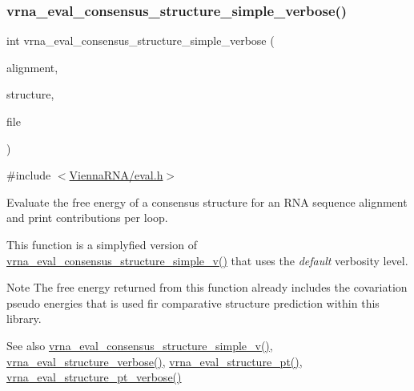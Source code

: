 \subsubsection{\texorpdfstring{vrna\_eval\_consensus\_structure\_simple\_verbose()}{vrna\_eval\_consensus\_structure\_simple\_verbose()}}
{\footnotesize\ttfamily int vrna\+\_\+eval\+\_\+consensus\+\_\+structure\+\_\+simple\+\_\+verbose (\begin{DoxyParamCaption}\item[{const char $\ast$$\ast$}]{alignment,  }\item[{const char $\ast$}]{structure,  }\item[{F\+I\+LE $\ast$}]{file }\end{DoxyParamCaption})}



{\ttfamily \#include $<$\mbox{\hyperlink{eval_8h}{Vienna\+R\+N\+A/eval.\+h}}$>$}



Evaluate the free energy of a consensus structure for an R\+NA sequence alignment and print contributions per loop. 

This function is a simplyfied version of \mbox{\hyperlink{group__eval_gad88927c62ab0a8b534e078e44be1b36e}{vrna\+\_\+eval\+\_\+consensus\+\_\+structure\+\_\+simple\+\_\+v()}} that uses the {\itshape default} verbosity level.

\begin{DoxyNote}{Note}
The free energy returned from this function already includes the covariation pseudo energies that is used fir comparative structure prediction within this library.
\end{DoxyNote}
\begin{DoxySeeAlso}{See also}
\mbox{\hyperlink{group__eval_gad88927c62ab0a8b534e078e44be1b36e}{vrna\+\_\+eval\+\_\+consensus\+\_\+structure\+\_\+simple\+\_\+v()}}, \mbox{\hyperlink{group__eval_ga0928d699d310178f84ee2351034e5cb5}{vrna\+\_\+eval\+\_\+structure\+\_\+verbose()}}, \mbox{\hyperlink{group__eval_gadbd09372ddfd7a450bbd590c96a6bfe4}{vrna\+\_\+eval\+\_\+structure\+\_\+pt()}}, \mbox{\hyperlink{group__eval_ga8a517cfeeae8c376ae7b1e0c401d38b4}{vrna\+\_\+eval\+\_\+structure\+\_\+pt\+\_\+verbose()}}
\end{DoxySeeAlso}

